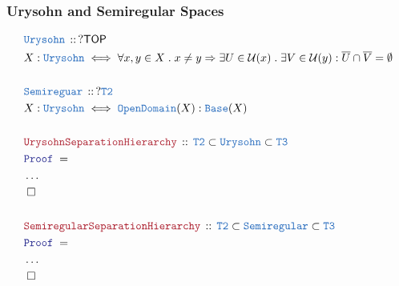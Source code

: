 \documentclass[12pt]{scrartcl}
\newcommand{\TYPE}[1]{\textcolor{NavyBlue}{\mathtt{#1}}}
\newcommand{\LOGIC}[1]{\textcolor{Blue}{\mathtt{#1}}}
\newcommand{\THM}[1]{\textcolor{Maroon}{\mathtt{#1}}}
\renewcommand{\.}{\; . \;}
\newcommand{\Theorem}[2]{& \THM{#1} \, :: \, #2 \\ & \Proof = \\ }
\newcommand{\DeclareType}[2]{& \TYPE{#1} \, :: \, #2 \\}
\newcommand{\DefineType}[3]{& #1 : \TYPE{#2} \iff #3 \\}
\newcommand{\Page}[1]{ \begin{align*} #1 \end{align*}   }
\newcommand{\NoProof}{ & \ldots \\ \EndProof}
\newcommand{\Imply}{\Rightarrow}
\newcommand{\QED}{\; \square}
\newcommand{\EndProof}{& \QED \\}
\newcommand{\Proof}{\LOGIC{Proof} \; }
\newcommand{\TOP}{\mathsf{TOP}}
\renewcommand{\U}{\mathcal{U}}
\begin{document}
\subsubsection{Urysohn and Semiregular Spaces}
\Page{
	\DeclareType{Urysohn}{?\TOP}
	\DefineType{X}{Urysohn}
	{
		\forall x,y \in X \. 
		x \neq y \Imply 
		\exists U \in \U(x) \. 
		\exists V \in \U(y) :
		\overline{U} \cap \overline{V} = \emptyset
	}
	\\
	\DeclareType{Semireguar}{?\TYPE{T2}}
	\DefineType{X}{Urysohn}
	{
		\TYPE{OpenDomain}(X) : \TYPE{Base}(X)
	}
	\\
	\Theorem{UrysohnSeparationHierarchy}
	{
		\TYPE{T2} \subset \TYPE{Urysohn} \subset \TYPE{T3}
	}
	\NoProof
	\\
	\Theorem{SemiregularSeparationHierarchy}
	{
		\TYPE{T2} \subset \TYPE{Semiregular} \subset \TYPE{T3}
	}
	\NoProof
}
\newpage
\end{document}
